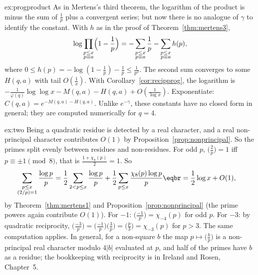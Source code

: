 \begin{solution}{ex:progproduct}
\idea As in Mertens's third theorem, the logarithm of the product is minus the sum of $\frac1p$ plus a convergent series; but now there is no
analogue of $\gamma$ to identify the constant.
\writeup With $h$ as in the proof of Theorem~\ref{thm:mertens3},
\[
\log\prod_{\substack{p\le x\\p\equiv a}}\Bigl(1-\frac1p\Bigr)=-\sum_{\substack{p\le x\\p\equiv a}}\frac1p-\sum_{\substack{p\le x\\p\equiv a}}h(p),
\]
where $0\le h(p)=-\log(1-\frac1p)-\frac1p\le\frac1{p^2}$. The second sum converges to some $H(q,a)$ with tail $O(\frac1x)$. With Corollary~\ref{cor:recipprog}, the logarithm is $-\frac1{\varphi(q)}\log\log x-M(q,a)-H(q,a)+O(\frac1{\log x})$.
Exponentiate: $C(q,a)=e^{-M(q,a)-H(q,a)}$. Unlike $e^{-\gamma}$, these constants have no closed form in general; they are computed numerically
for $q=4$.
\end{solution}

\begin{solution}{ex:two}
\idea Being a quadratic residue is detected by a real character, and a real non-principal character contributes $O(1)$ by Proposition~\ref{prop:nonprincipal}. So
the primes split evenly between residues and non-residues.
\writeup For odd $p$, $\bigl(\frac2p\bigr)=1$ iff $p\equiv\pm1\pmod8$, that is $\frac{1+\chi_8(p)}2=1$. So
\[
\begin{aligned}\sum_{\substack{p\le x\\(2/p)=1}}\frac{\log p}p&=\frac12\sum_{2<p\le x}\frac{\log p}p+\frac12\sum_{p\le x}\frac{\chi_8(p)\log p}p\eqbr=\frac12\log x+O(1),\end{aligned}
\]
by Theorem~\ref{thm:mertens1} and Proposition~\ref{prop:nonprincipal} (the prime powers again contribute $O(1)$). For $-1$: $\bigl(\frac{-1}p\bigr)=\chi_{-4}(p)$ for odd $p$. For $-3$:
by quadratic reciprocity, $\bigl(\frac{-3}p\bigr)=\bigl(\frac{-1}p\bigr)\bigl(\frac3p\bigr)=\bigl(\frac p3\bigr)=\chi_{-3}(p)$ for $p>3$. The same computation applies. In general, for a non-square $b$ the map
$p\mapsto\bigl(\frac bp\bigr)$ is a non-principal real character modulo $4|b|$ evaluated at $p$, and half of the primes have $b$ as a residue; the bookkeeping with
reciprocity is in Ireland and Rosen, Chapter~5.
\end{solution}

